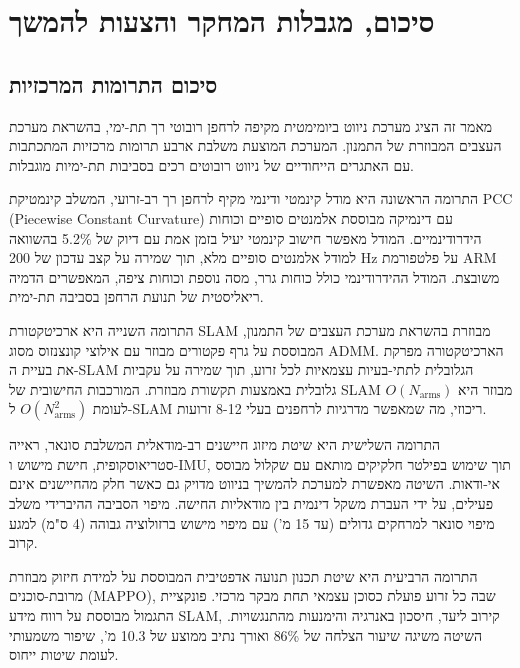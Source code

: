 

\section{סיכום, מגבלות המחקר והצעות להמשך}
\label{sec:ch09_conclusion}

\subsection{סיכום התרומות המרכזיות}
\label{sec:ch09_contributions}

מאמר זה הציג מערכת ניווט ביומימטית מקיפה לרחפן רובוטי רך תת-ימי, בהשראת מערכת העצבים המבוזרת של התמנון. המערכת המוצעת משלבת ארבע תרומות מרכזיות המתכתבות עם האתגרים הייחודיים של ניווט רובוטים רכים בסביבות תת-ימיות מוגבלות.

התרומה הראשונה היא מודל קינמטי ודינמי מקיף לרחפן רך רב-זרועי, המשלב קינמטיקת PCC (Piecewise Constant Curvature) עם דינמיקה מבוססת אלמנטים סופיים וכוחות הידרודינמיים. המודל מאפשר חישוב קינמטי יעיל בזמן אמת עם דיוק של 5.2\% בהשוואה למודל אלמנטים סופיים מלא, תוך שמירה על קצב עדכון של 200 Hz על פלטפורמת ARM משובצת. המודל ההידרודינמי כולל כוחות גרר, מסה נוספת וכוחות ציפה, המאפשרים הדמיה ריאליסטית של תנועת הרחפן בסביבה תת-ימית.

התרומה השנייה היא ארכיטקטורת SLAM מבוזרת בהשראת מערכת העצבים של התמנון, המבוססת על גרף פקטורים מבוזר עם אילוצי קונצנזוס מסוג ADMM. הארכיטקטורה מפרקת את בעיית ה-SLAM הגלובלית לתתי-בעיות עצמאיות לכל זרוע, תוך שמירה על עקביות גלובלית באמצעות תקשורת מבוזרת. המורכבות החישובית של SLAM מבוזר היא $O(N_{\text{arms}})$ לעומת $O(N_{\text{arms}}^2)$ ל-SLAM ריכוזי, מה שמאפשר מדרגיות לרחפנים בעלי 8-12 זרועות.

התרומה השלישית היא שיטת מיזוג חיישנים רב-מודאלית המשלבת סונאר, ראייה סטריאוסקופית, חישת מישוש ו-IMU, תוך שימוש בפילטר חלקיקים מותאם עם שקלול מבוסס אי-ודאות. השיטה מאפשרת למערכת להמשיך בניווט מדויק גם כאשר חלק מהחיישנים אינם פעילים, על ידי העברת משקל דינמית בין מודאליות החישה. מיפוי הסביבה ההיברידי משלב מיפוי סונאר למרחקים גדולים (עד 15 מ') עם מיפוי מישוש ברזולוציה גבוהה (4 ס"מ) למגע קרוב.

התרומה הרביעית היא שיטת תכנון תנועה אדפטיבית המבוססת על למידת חיזוק מבוזרת מרובת-סוכנים (MAPPO), שבה כל זרוע פועלת כסוכן עצמאי תחת מבקר מרכזי. פונקציית התגמול מבוססת על רווח מידע SLAM, קירוב ליעד, חיסכון באנרגיה והימנעות מהתנגשויות. השיטה משיגה שיעור הצלחה של 86\% ואורך נתיב ממוצע של 10.3 מ', שיפור משמעותי לעומת שיטות ייחוס.

